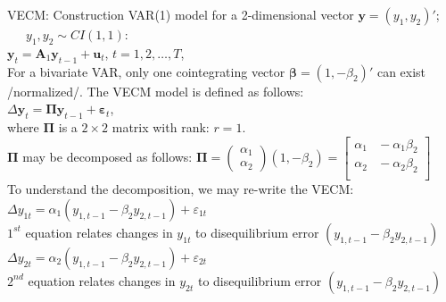 \documentclass[usenames,dvipsnames]{beamer}
\begin{document}
\begin{frame}{VECM: Construction}
\footnotesize
VAR(1) model for a 2-dimensional vector $\bm{y} = (y_1, y_2)'$; ~~~$y_1, y_2 \sim CI(1,1)$:\\
\vspace{0.2cm}
$\bm{y}_t = \bm{A}_1 \bm{y}_{t-1} + \bm{u}_t$, \qquad $t=1,2, \dots, T$, \\
\bigskip
For a bivariate VAR, only one cointegrating vector  $\bm{\beta}=(1, -\beta_2)'$  can exist /normalized/. The VECM model is defined as follows:\\
\medskip
$\Delta\bm{y}_t = \bm{\Pi} \bm{y}_{t-1} + \bm{\varepsilon}_t$, \\
\medskip
where $\bm{\Pi}$ is a $2 \times 2$ matrix with rank: $r=1$.\\
\hspace*{8mm} $\bm{\Pi}$ may be decomposed as follows: $\bm{\Pi} \!=\! \begin{pmatrix}
\alpha_1 \\ \alpha_2 
\end{pmatrix} \!
\left( 1, -\beta_2 \right) \! = \!\!
\begin{bmatrix}
\alpha_1 & \!\!  -\alpha_1 \beta_2 \\ 
\alpha_2 & \!\! -\alpha_2 \beta_2 \\
\end{bmatrix}$ \\
\medskip
To understand the decomposition, we may re-write the VECM: \\
\medskip
$\Delta y_{1t} = \alpha_1 (y_{1,t-1} - \beta_2 y_{2,t-1}) + \varepsilon_{1t}$ \\ 
\vspace{0.1cm}
$1^{st}$ equation relates changes in $y_{1t}$ to  disequilibrium error $(y_{1,t-1} \! - \! \beta_2 y_{2,t-1})$\\
\vspace{0.2cm}
$\Delta y_{2t} = \alpha_2 (y_{1,t-1} - \beta_2 y_{2,t-1}) + \varepsilon_{2t}$ \\ 
\vspace{0.1cm}
$2^{nd}$ equation relates changes in $y_{2t}$ to disequilibrium error $(y_{1,t-1} \! - \! \beta_2 y_{2,t-1})$
\end{frame}
\end{document}
